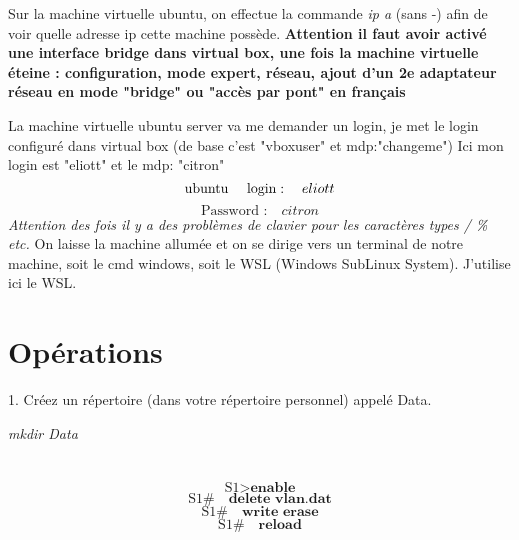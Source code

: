 \documentclass[a4paper,11pt]{article}
\begin{document}
	Sur la machine virtuelle ubuntu, on effectue la commande \textit{ip a} (sans -) afin de voir quelle adresse ip cette machine possède. \textbf{Attention il faut avoir activé une interface bridge dans virtual box, une fois la machine virtuelle éteine : configuration, mode expert, réseau, ajout d'un 2e adaptateur réseau en mode "bridge" ou "accès par pont" en français}
	
	La machine virtuelle ubuntu server va me demander un login, je met le login configuré dans virtual box (de base c'est "vboxuser" et mdp:"changeme") Ici mon login est "eliott" et le mdp: "citron"
	\begin{equation*}
		\text{ubuntu \quad  login} : \quad eliott
	\end{equation*}
	\begin{equation*}
		\text{Password :} \quad citron
	\end{equation*}
	\newline
	\textit{Attention des fois il y a des problèmes de clavier pour les caractères types / \% etc.  } \newline
	On laisse la machine allumée et on se dirige vers un terminal de notre machine, soit le cmd windows, soit le WSL (Windows SubLinux System). J'utilise ici le WSL.
	
	 
	\section{Opérations}
	1. Créez un répertoire (dans votre répertoire personnel) appelé Data.
	
	\textit{mkdir Data}
	
	\section{}
	
	\begin{equation}
		\text{S1}>\textbf{enable}
	\end{equation}
	\begin{equation}
		\text{S1} \#  \quad\textbf{delete vlan.dat}
	\end{equation}
	\begin{equation}
		\text{S1} \# \quad \textbf{write erase}
	\end{equation}
	\begin{equation}
		\text{S1} \# \quad \textbf{reload}
	\end{equation}
\end{document}
